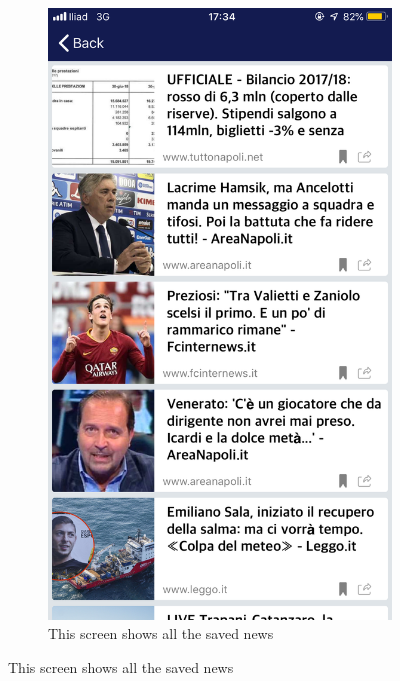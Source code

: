 \documentclass[numbers=noenddot, 12pt, a4paper, oneside]{scrbook}
\begin{document}
\begin{figure}[H]
\begin{subfigure}{.5\textwidth}
		\includegraphics[width=.8\linewidth]{images/Screen/NewsFavorite}
		\caption{This screen shows all the saved news}
	\end{subfigure}
\end{figure}
\end{document}
